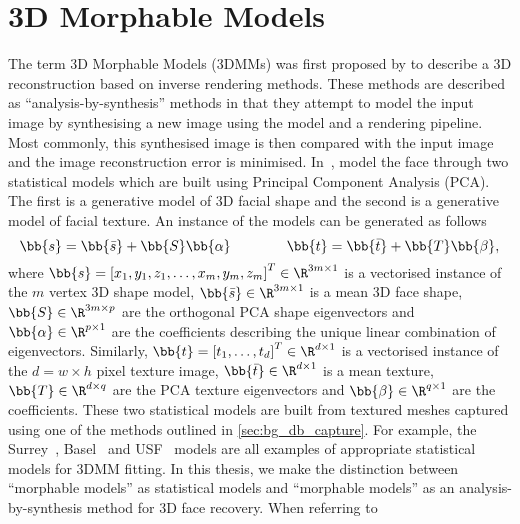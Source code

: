 \section{3D Morphable Models}\label{sec:bg_3dmm}
The term 3D Morphable Models (3DMMs) was first proposed by
\citet{volker1999morphable} to describe a 3D reconstruction based on inverse
rendering methods. These methods are described as ``analysis-by-synthesis''
methods in that they attempt to model the input image by synthesising a new
image using the model and a rendering pipeline. Most commonly, this synthesised
image is then compared with the input image and the image reconstruction error
is minimised. In~\cite{volker1999morphable}, 
model the face through two statistical models which are built using
Principal Component Analysis (PCA). The first is a generative model of 3D
facial shape and the second is a generative model of facial texture.
An instance of the models can be generated as follows
\begin{equation}\label{eg:bg_3dmm_pca}
	\bb{s} = \bb{\bar{s}} + \bb{S} \bb{\alpha} \qquad \qquad \bb{t} = \bb{\bar{t}} + \bb{T} \bb{\beta},
\end{equation}
where
$\bb{s} = {[x_1, y_1, z_1, \ldots, x_m, y_m, z_m]}^T \in \R^{3m \times 1}$ is
a vectorised instance of the $m$ vertex 3D shape model,
$\bb{\bar{s}} \in \R^{3m \times 1}$ is a mean 3D face shape,
$\bb{S} \in \R^{3m \times p}$ are the orthogonal PCA shape eigenvectors and
$\bb{\alpha} \in \R^{p \times 1}$ are the coefficients describing the unique
linear combination of eigenvectors. Similarly,
$\bb{t} = {[t_1, \ldots, t_d]}^T \in \R^{d \times 1}$ is
a vectorised instance of the $d = w \times h$ pixel texture image,
$\bb{\bar{t}} \in \R^{d \times 1}$ is a mean texture,
$\bb{T} \in \R^{d \times q}$ are the PCA texture eigenvectors and
$\bb{\beta} \in \R^{q \times 1}$ are the coefficients.
These two statistical models are built from textured meshes captured using
one of the methods outlined in \cref{sec:bg_db_capture}. For example,
the Surrey~\cite{Huber:F5Dca9zy}, Basel~\cite{paysan20093d} and
USF~\cite{volker1999morphable} models are all examples of appropriate
statistical models for 3DMM fitting.
In this thesis, we make the distinction between
``morphable models'' as statistical models and ``morphable models'' as an
analysis-by-synthesis method for 3D face recovery. When referring to
